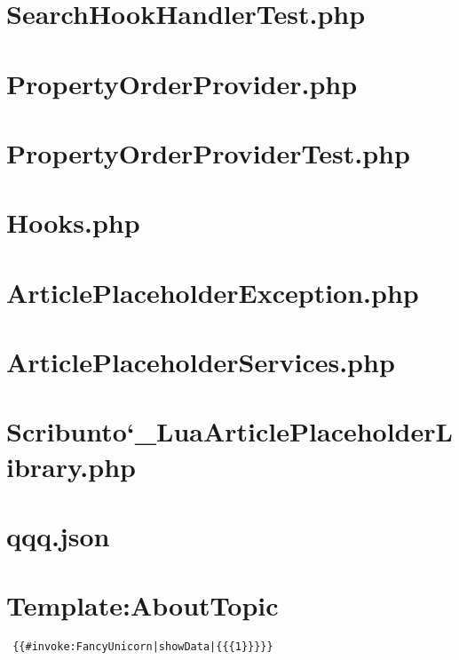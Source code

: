 \section{SearchHookHandlerTest.php}


\section{PropertyOrderProvider.php}


\section{PropertyOrderProviderTest.php}


\section{Hooks.php}


\section{ArticlePlaceholderException.php}


\section{ArticlePlaceholderServices.php}


\section{Scribunto\char`_LuaArticlePlaceholderLibrary.php}


\section{qqq.json}


\section{Template:AboutTopic}
\begin{lstlisting}
 {{#invoke:FancyUnicorn|showData|{{{1}}}}}
\end{lstlisting}


